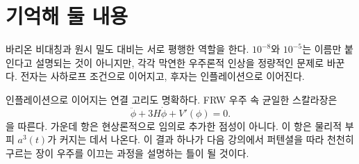 \section{기억해 둘 내용}

바리온 비대칭과 원시 밀도 대비는 서로 평행한 역할을 한다. \(10^{-8}\)와 \(10^{-5}\)는 이름만 붙인다고 설명되는 것이 아니지만, 각각 막연한 우주론적 인상을 정량적인 문제로 바꾼다. 전자는 사하로프 조건으로 이어지고, 후자는 인플레이션으로 이어진다.

인플레이션으로 이어지는 연결 고리도 명확하다. FRW 우주 속 균일한 스칼라장은
\[
\ddot\phi+3H\dot\phi+V'(\phi)=0.
\]
을 따른다. 가운데 항은 현상론적으로 임의로 추가한 점성이 아니다. 이 항은 물리적 부피 \(a^3(t)\)가 커지는 데서 나온다. 이 결과 하나가 다음 강의에서 퍼텐셜을 따라 천천히 구르는 장이 우주를 이끄는 과정을 설명하는 틀이 될 것이다.